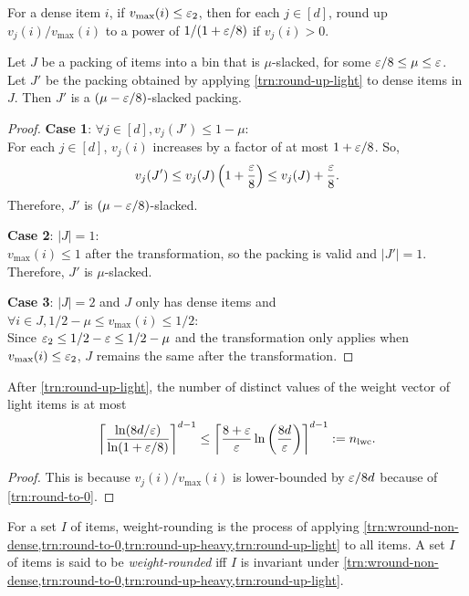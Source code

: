 \begin{transformation}
\label{trn:round-up-light}
For a dense item $i$, if $v_{\max}(i) \le \varepsilon_2$, then for each $j \in [d]$,
round up $v_j(i)/v_{\max}(i)$ to a power of $1/(1+\varepsilon/8)$ if $v_j(i) > 0$.
\end{transformation}
\begin{lemma}
\label{lem:round-up-light}
Let $J$ be a packing of items into a bin that is $\mu$-slacked, for some
$\varepsilon/8 \le \mu \le \varepsilon$.
Let $J'$ be the packing obtained by applying \cref{trn:round-up-light}
to dense items in $J$. Then $J'$ is a $(\mu-\varepsilon/8)$-slacked packing.
\end{lemma}
\begin{proof}
\textbf{Case 1}: $\forall j \in [d], v_j(J') \le 1-\mu$:\\
For each $j \in [d]$, $v_j(i)$ increases by a factor of at most $1+\varepsilon/8$.
So,
\[ v_j(J') \le v_j(J)\left(1+\frac{\varepsilon}{8}\right) \le v_j(J) + \frac{\varepsilon}{8}. \]
Therefore, $J'$ is $(\mu - \varepsilon/8)$-slacked.

\textbf{Case 2}: $|J| = 1$:\\
$v_{\max}(i) \le 1$ after the transformation, so the packing is valid and $|J'| = 1$.
Therefore, $J'$ is $\mu$-slacked.

\textbf{Case 3}: $|J| = 2$ and $J$ only has dense items
and $\forall i \in J, 1/2 - \mu \le v_{\max}(i) \le 1/2$:\\
Since $\varepsilon_2 \le 1/2 - \varepsilon \le 1/2-\mu$ and
the transformation only applies when $v_{\max}(i) \le \varepsilon_2$,
$J$ remains the same after the transformation.
\end{proof}

\begin{lemma}
\label{lem:round-up-light-n}
After \cref{trn:round-up-light},
the number of distinct values of the weight vector of light items is at most
\[ \left\lceil \frac{\ln(8d/\varepsilon)}{\ln(1+\varepsilon/8)} \right\rceil^{d-1}
\le \left\lceil \frac{8+\varepsilon}{\varepsilon}\ln\left(\frac{8d}{\varepsilon}\right) \right\rceil^{d-1} := n_{\mathrm{lwc}}. \]
\end{lemma}
\begin{proof}
This is because $v_j(i)/v_{\max}(i)$ is lower-bounded by $\varepsilon/8d$
because of \cref{trn:round-to-0}.
\end{proof}

\begin{transformation}
\label{trn:wround}
For a set $I$ of items, weight-rounding is the process of applying
\cref{trn:wround-non-dense,trn:round-to-0,trn:round-up-heavy,trn:round-up-light} to all items.
A set $I$ of items is said to be \emph{weight-rounded} iff $I$ is invariant under
\cref{trn:wround-non-dense,trn:round-to-0,trn:round-up-heavy,trn:round-up-light}.
\end{transformation}

